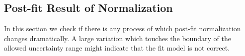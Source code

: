 %
%
%
%
\subsection{Post-fit Result of Normalization} 

In this section we check if there is any process of which post-fit 
normalization changes dramatically. A large variation which touches 
the boundary of the allowed uncertainty range might indicate that 
the fit model is not correct. 

